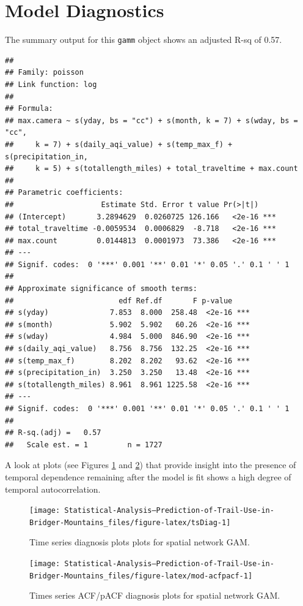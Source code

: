 \documentclass[
]{book}
\begin{document}
\hypertarget{model-diagnostics}{%
\section{Model Diagnostics}\label{model-diagnostics}}

The summary output for this \texttt{gamm} object shows an adjusted R-sq of 0.57.

\begin{verbatim}
## 
## Family: poisson 
## Link function: log 
## 
## Formula:
## max.camera ~ s(yday, bs = "cc") + s(month, k = 7) + s(wday, bs = "cc", 
##     k = 7) + s(daily_aqi_value) + s(temp_max_f) + s(precipitation_in, 
##     k = 5) + s(totallength_miles) + total_traveltime + max.count
## 
## Parametric coefficients:
##                    Estimate Std. Error t value Pr(>|t|)    
## (Intercept)       3.2894629  0.0260725 126.166   <2e-16 ***
## total_traveltime -0.0059534  0.0006829  -8.718   <2e-16 ***
## max.count         0.0144813  0.0001973  73.386   <2e-16 ***
## ---
## Signif. codes:  0 '***' 0.001 '**' 0.01 '*' 0.05 '.' 0.1 ' ' 1
## 
## Approximate significance of smooth terms:
##                        edf Ref.df       F p-value    
## s(yday)              7.853  8.000  258.48  <2e-16 ***
## s(month)             5.902  5.902   60.26  <2e-16 ***
## s(wday)              4.984  5.000  846.90  <2e-16 ***
## s(daily_aqi_value)   8.756  8.756  132.25  <2e-16 ***
## s(temp_max_f)        8.202  8.202   93.62  <2e-16 ***
## s(precipitation_in)  3.250  3.250   13.48  <2e-16 ***
## s(totallength_miles) 8.961  8.961 1225.58  <2e-16 ***
## ---
## Signif. codes:  0 '***' 0.001 '**' 0.01 '*' 0.05 '.' 0.1 ' ' 1
## 
## R-sq.(adj) =   0.57   
##   Scale est. = 1         n = 1727
\end{verbatim}

A look at plots (see Figures \ref{fig:tsDiag} and \ref{fig:mod-acfpacf}) that provide insight into the presence of temporal dependence remaining after the model is fit shows a high degree of temporal autocorrelation.

\begin{figure}

{\centering \texttt{[image: Statistical-Analysis--Prediction-of-Trail-Use-in-Bridger-Mountains\_files/figure-latex/tsDiag-1]} 

}

\caption{Time series diagnosis plots plots for spatial network GAM.}\label{fig:tsDiag}
\end{figure}

\begin{figure}

{\centering \texttt{[image: Statistical-Analysis--Prediction-of-Trail-Use-in-Bridger-Mountains\_files/figure-latex/mod-acfpacf-1]} 

}

\caption{Times series ACF/pACF diagnosis plots for spatial network GAM.}\label{fig:mod-acfpacf}
\end{figure}
\end{document}
